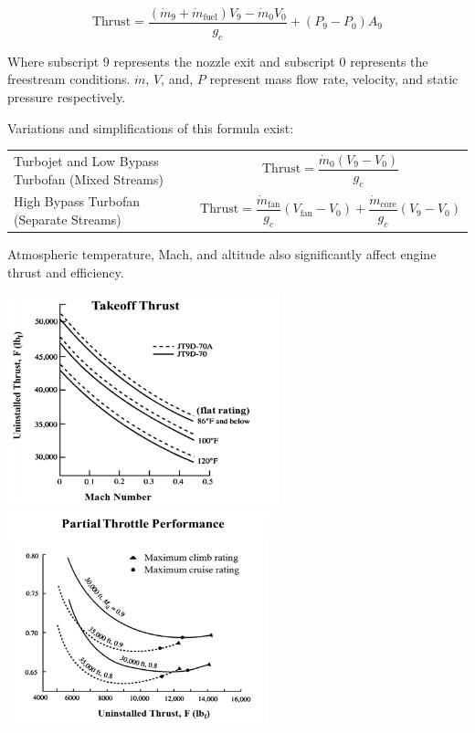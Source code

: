 \documentclass[
]{book}
\begin{document}
\[\text{Thrust} = \frac{\left( {\dot{m}}_{9} + {\dot{m}}_{\text{fuel}} \right)V_{9} - {\dot{m}}_{0}V_{0}}{g_{c}} + (P_{9} - P_{0})A_{9}\]

Where subscript \(9\) represents the nozzle exit and subscript \(0\) represents
the freestream conditions. \(\dot{m}\), \(V\), and, \(P\) represent mass flow
rate, velocity, and static pressure respectively.

Variations and simplifications of this formula exist:

\begin{longtable}[]{@{}ll@{}}
\toprule
\endhead
\begin{minipage}[t]{0.26\columnwidth}\raggedright
Turbojet and Low Bypass Turbofan (Mixed Streams)\strut
\end{minipage} & \begin{minipage}[t]{0.68\columnwidth}\raggedright
\[\text{Thrust} = \frac{{\dot{m}}_{0}(V_{9} - V_{0})}{g_{c}}\]\strut
\end{minipage}\tabularnewline
\begin{minipage}[t]{0.26\columnwidth}\raggedright
High Bypass Turbofan (Separate Streams)\strut
\end{minipage} & \begin{minipage}[t]{0.68\columnwidth}\raggedright
\[\text{Thrust} = \frac{{\dot{m}}_{\text{fan}}}{g_{c}}(V_{\text{fan}} - V_{0}) + \frac{{\dot{m}}_{\text{core}}}{g_{c}}(V_{9} - V_{0})\]\strut
\end{minipage}\tabularnewline
\bottomrule
\end{longtable}

Atmospheric temperature, Mach, and altitude also significantly affect engine
thrust and efficiency.

\includegraphics[width=3.1in,height=2.43333in]{media/17/image14.png}\includegraphics[width=2.99375in,height=2.44722in]{media/17/image15.png}
\end{document}
